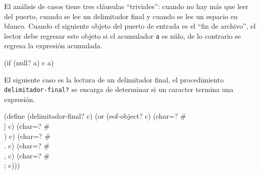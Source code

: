 \eatline
{}\nwendcode{}\nwdocspar

El análisis de casos tiene tres cláusulas ``triviales'': cuando no hay más que leer del puerto, cuando se lee un delimitador final y cuando se lee un espacio en blanco. Cuando el siguiente objeto del puerto de entrada es el ``fin de archivo'', el lector debe regresar este objeto si el acumulador {\tt{}a} es núlo, de lo contrario se regresa la expresión acumulada.

\nwenddocs{}\endmoddef
(if (null? a) c a)
\nwendcode{}\nwdocspar

El siguiente caso es la lectura de un delimitador final, el procedimiento {\tt{}\protect{}delimitador-final?} se encarga de determinar si un caracter termina una expresión.

\nwenddocs{}\endmoddef
(define (delimitador-final? c)
  (or (eof-object? c)
      (char=? #\\] c)
      (char=? #\\) c)
      (char=? #\\. c)
      (char=? #\\, c)
      (char=? #\\; c)))

\eatline
{}\nwendcode{}\nwdocspar

